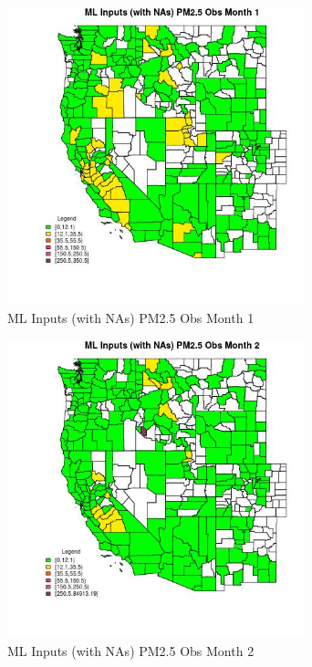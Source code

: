 
\clearpage 

\begin{figure} 
\centering  
\includegraphics[width=0.77\textwidth]{Code_Outputs/Report_ML_input_PM25_Step4_part_f_de_duplicated_aves_prioritize_24hr_obswNAs_CountyPM25_ObsmedianMonth1.jpg} 
\caption{\label{fig:Report_ML_input_PM25_Step4_part_f_de_duplicated_aves_prioritize_24hr_obswNAsCountyPM25_ObsmedianMonth1}ML Inputs (with NAs) PM2.5 Obs Month 1} 
\end{figure} 
 

\begin{figure} 
\centering  
\includegraphics[width=0.77\textwidth]{Code_Outputs/Report_ML_input_PM25_Step4_part_f_de_duplicated_aves_prioritize_24hr_obswNAs_CountyPM25_ObsmedianMonth2.jpg} 
\caption{\label{fig:Report_ML_input_PM25_Step4_part_f_de_duplicated_aves_prioritize_24hr_obswNAsCountyPM25_ObsmedianMonth2}ML Inputs (with NAs) PM2.5 Obs Month 2} 
\end{figure} 
 


